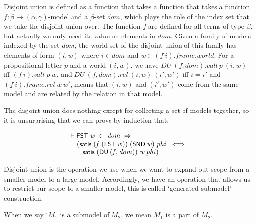 \documentclass[letterpaper]{article}
\renewcommand{\HOLConst}[1]{{\textsf{\upshape\small #1}}}
\newenvironment{holmath}{\begin{displaymath}\begin{array}{l}}{\end{array}\end{displaymath}\ignorespacesafterend}
\begin{document}
Disjoint union is defined as a function that takes a function that takes a function $f:\beta\to (\alpha,\gamma)$-model and a $\beta$-set $dom$, which plays the role of the index set that we take the disjoint union over. The function $f$ are defined for all terms of type $\beta$, but actually we only need its value on elements in $dom$. Given a family of models indexed by the set $dom$, the world set of the disjoint union of this family has elements of form $(i,w)$ where $i\in dom$ and $w\in (f \ i).frame.world$. For a propositional letter $p$ and a world $(i,w)$, we have $DU \ (f,dom).valt \ p\ (i,w)$ iff $(f \ i).valt \ p \ w$, and $DU \ (f,dom).rel \ (i,w) \ (i',w')$ iff $i=i'$ and $(f\ i).frame.rel \ w \ w'$, means that $(i,w)$ and $(i',w')$ come from the same model and are related by the relation in that model. 

The disjoint union does nothing except for collecting a set of models together, so it is unsurprising that we can prove by induction that:

\begin{holmath}
  \ensuremath{\HOLTokenTurnstile}\HOLConst{FST}\;\HOLFreeVar{w}\;\HOLSymConst{\HOLTokenIn{}}\;\HOLFreeVar{dom}\;\HOLSymConst{\HOLTokenImp{}}\\
\;\;\;\;\;(\HOLConst{satis}\;(\HOLFreeVar{f}\;(\HOLConst{FST}\;\HOLFreeVar{w}))\;(\HOLConst{SND}\;\HOLFreeVar{w})\;\HOLFreeVar{phi}\;\HOLSymConst{\HOLTokenEquiv{}}\\
\;\;\;\;\;\;\;\;\HOLConst{satis}\;(\HOLConst{DU}\;(\HOLFreeVar{f}\HOLSymConst{,}\HOLFreeVar{dom}))\;\HOLFreeVar{w}\;\HOLFreeVar{phi})
\end{holmath}

Disjoint union is the operation we use when we want to expand out scope from a smaller model to a large model. Accordingly, we have an operation that allows us to restrict our scope to a smaller model, this is called `generated submodel' construction. 

When we say `$M_1$ is a submodel of $M_2$, we mean $M_1$ is a part of $M_2$.
\end{document}
